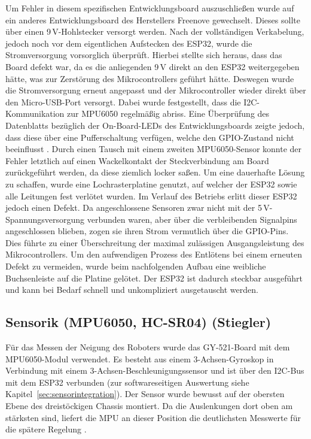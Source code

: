 \documentclass[fontsize=12pt,
parskip=half,	%
department=FakM,  %
logostyle=flat,
twoside, %
DIV=15,BCOR=10mm, %
]{OTHRreprt}
\begin{document}
Um Fehler in diesem spezifischen Entwicklungsboard auszuschließen wurde auf ein anderes Entwicklungsboard des Herstellers Freenove gewechselt. 
Dieses sollte über einen 9\,V-Hohlstecker versorgt werden. 
Nach der vollständigen Verkabelung, jedoch noch vor dem eigentlichen Aufstecken des ESP32, wurde die Stromversorgung vorsorglich überprüft. 
Hierbei stellte sich heraus, dass das Board defekt war, da es die anliegenden 9\,V direkt an den ESP32 weitergegeben hätte, was zur Zerstörung des Mikrocontrollers geführt hätte. 
Deswegen wurde die Stromversorgung erneut angepasst und der Mikrocontroller wieder direkt über den Micro-USB-Port versorgt. 
Dabei wurde festgestellt, dass die I2C-Kommunikation zur MPU6050 regelmäßig abriss. Eine Überprüfung des Datenblatts bezüglich der On-Board-LEDs des Entwicklungsboards zeigte jedoch, dass diese über eine Pufferschaltung verfügen, welche den GPIO-Zustand nicht beeinflusst \cite{freenove_breakout_design}. 
Durch einen Tausch mit einem zweiten MPU6050-Sensor konnte der Fehler letztlich auf einen Wackelkontakt der Steckverbindung am Board zurückgeführt werden, da diese ziemlich locker saßen.
Um eine dauerhafte Lösung zu schaffen, wurde eine Lochrasterplatine genutzt, auf welcher der ESP32 sowie alle Leitungen fest verlötet wurden. Im Verlauf des Betriebs erlitt dieser ESP32 jedoch einen Defekt. Da angeschlossene Sensoren zwar nicht mit der 5\,V-Spannungsversorgung verbunden waren, aber über die verbleibenden Signalpins angeschlossen blieben, zogen sie ihren Strom vermutlich über die GPIO-Pins. Dies führte zu einer Überschreitung der maximal zulässigen Ausgangsleistung des Mikrocontrollers. Um den aufwendigen Prozess des Entlötens bei einem erneuten Defekt zu vermeiden, wurde beim nachfolgenden Aufbau eine weibliche Buchsenleiste auf die Platine gelötet. Der ESP32 ist dadurch steckbar ausgeführt und kann bei Bedarf schnell und unkompliziert ausgetauscht werden. 


\subsection{Sensorik (MPU6050, HC-SR04) (Stiegler)}
\label{subsec:sensorik_hardware}

Für das Messen der Neigung des Roboters wurde das GY-521-Board mit dem MPU6050-Modul verwendet. Es besteht aus einem 3-Achsen-Gyroskop in Verbindung mit einem 3-Achsen-Be\-schleu\-ni\-gungs\-sen\-sor und ist über den I2C-Bus mit dem ESP32 verbunden (zur soft\-ware\-sei\-ti\-gen Auswertung siehe Kapitel~\ref{sec:sensorintegration}). Der Sensor wurde bewusst auf der obersten Ebene des dreistöckigen Chassis montiert. Da die Auslenkungen dort oben am stärksten sind, liefert die MPU an dieser Position die deutlichsten Messwerte für die spätere Regelung \cite{az-deliveryGY521}.
\end{document}

